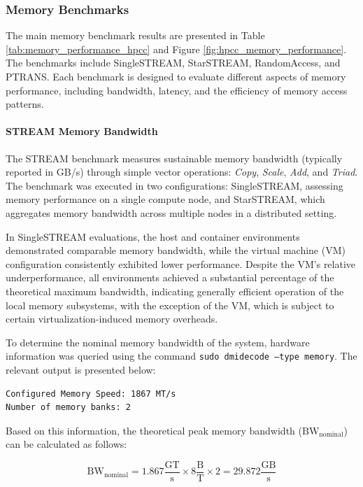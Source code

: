 \subsubsection{Memory Benchmarks}
The main memory benchmark results are presented in Table \ref{tab:memory_performance_hpcc} and Figure \ref{fig:hpcc_memory_performance}. The benchmarks include SingleSTREAM, StarSTREAM, RandomAccess, and PTRANS. Each benchmark is designed to evaluate different aspects of memory performance, including bandwidth, latency, and the efficiency of memory access patterns.

\paragraph{STREAM Memory Bandwidth}

The STREAM benchmark measures sustainable memory bandwidth (typically reported in GB/s) through simple vector operations: \textit{Copy}, \textit{Scale}, \textit{Add}, and \textit{Triad}. The benchmark was executed in two configurations: SingleSTREAM, assessing memory performance on a single compute node, and StarSTREAM, which aggregates memory bandwidth across multiple nodes in a distributed setting.

In SingleSTREAM evaluations, the host and container environments demonstrated comparable memory bandwidth, while the virtual machine (VM) configuration consistently exhibited lower performance. Despite the VM's relative underperformance, all environments achieved a substantial percentage of the theoretical maximum bandwidth, indicating generally efficient operation of the local memory subsystems, with the exception of the VM, which is subject to certain virtualization-induced memory overheads.

To determine the nominal memory bandwidth of the system, hardware information was queried using the command \texttt{sudo dmidecode --type memory}. The relevant output is presented below:

\begin{verbatim}
Configured Memory Speed: 1867 MT/s
Number of memory banks: 2
\end{verbatim}

Based on this information, the theoretical peak memory bandwidth ($\text{BW}_\text{nominal}$) can be calculated as follows:

\begin{equation*}
\text{BW}_\text{nominal} = 1.867 \frac{\text{GT}}{\text{s}} \times 8 \frac{\text{B}}{\text{T}} \times 2 = 29.872 \frac{\text{GB}}{\text{s}}
\end{equation*}


